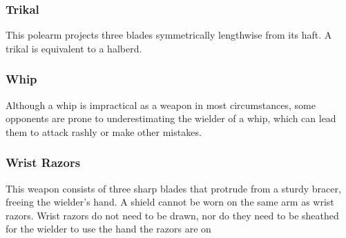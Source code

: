 \begin{multicols}{2}
\subsubsection{Trikal}
\label{itmmlee:trikal}
This polearm projects three blades symmetrically lengthwise
from its haft. A trikal is equivalent to a halberd.

\subsubsection{Whip}
\label{itmmlee:whip}
Although a whip is impractical as a weapon
in most circumstances, some opponents are prone
to underestimating the wielder of a whip, which can
lead them to attack rashly or make other mistakes.

\subsubsection{Wrist Razors}
\label{itmmlee:wristrazors}
This weapon consists of three sharp blades that protrude from
a sturdy bracer, freeing the wielder's hand. A shield cannot
be worn on the same arm as wrist razors. Wrist razors do not
need to be drawn, nor do they need to be sheathed for the
wielder to use the hand the razors are on

\end{multicols}
